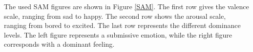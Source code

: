 \npar

The used SAM figures are shown in Figure \ref{SAM}. The first row gives the valence scale, ranging from sad to happy. The second row shows the arousal scale, ranging from bored to excited. The last row represents the different dominance levels. The left figure represents a submissive emotion, while the right figure corresponds with a dominant feeling.



